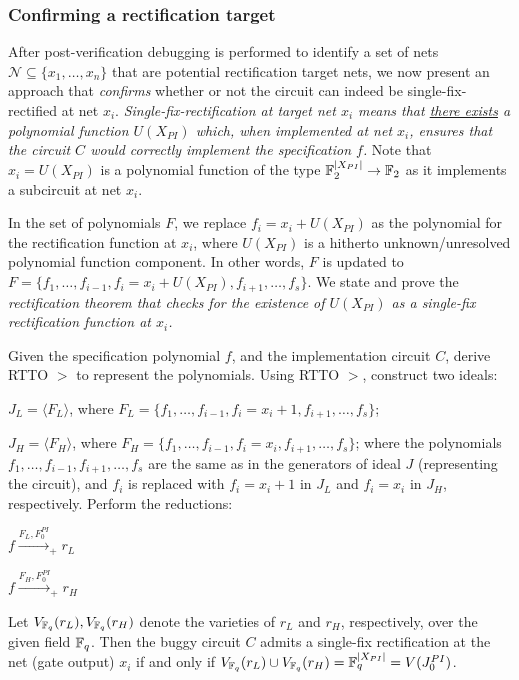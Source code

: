 \subsubsection{Confirming a rectification target} 
After post-verification debugging is performed to identify a set of
nets $\mathcal{N}\subseteq \{x_1,\dots,x_n\}$ that are potential
rectification target nets, we now present an approach that {\it confirms}
whether or not the circuit can indeed be single-fix-rectified at net
$x_i$. {\it Single-fix-rectification at target net $x_i$ means that
  \underline{there exists} a polynomial function $U(X_{PI})$ which,
  when implemented at net $x_i$, ensures that the circuit $C$ would
  correctly implement the specification $f$.} Note that
$x_i=U(X_{PI})$ is a polynomial function of the type
${\mathbb{F}}_2^{|X_{PI}|}\rightarrow{\mathbb{F}}_2$ as it implements a subcircuit at net $x_i$.

In the set of polynomials $F$, we replace $f_i = x_i+U(X_{PI})$ as the
polynomial for the rectification function at $x_i$, where $U(X_{PI})$
is a hitherto unknown/unresolved polynomial function component. In
other words, $F$ is updated to $F = \{f_1,\dots, f_{i-1}, f_i=
x_i+U(X_{PI}),f_{i+1},\dots,f_s\}$.  We state and prove the 
{\it rectification theorem that checks for the existence of
  $U(X_{PI})$ as a single-fix rectification function at $x_i$.}

\begin{Theorem}
Given the specification polynomial $f$, and the implementation circuit
$C$, derive RTTO $>$ to represent the polynomials. Using RTTO $>$,
construct two ideals:  
\bi
\item $J_L = \langle F_L\rangle$, where
  $F_L=\{f_1,\dots,f_{i-1},f_i=x_i+1,f_{i+1},\dots,f_s\}$;
\item $J_H = \langle F_H\rangle$, where
  $F_H=\{f_1,\dots,f_{i-1},f_i=x_i,f_{i+1},\dots,f_s\}$;
\ei
where the polynomials $f_1,\dots,f_{i-1},f_{i+1},\dots,f_s$ are the
same as in the generators of ideal $J$ (representing the circuit), and
$f_i$ is replaced with $f_i = x_i+1$ in $J_L$ and $f_i = x_i$ in $J_H$,
respectively. Perform the reductions: 
\bi
\item $f\xrightarrow{F_L, F_{0}^{PI}}_+r_L $
\item $f\xrightarrow{F_H,F_{0}^{PI}}_+r_H $
\ei

Let $V_{{\mathbb{F}}_{q}}(r_L), V_{{\mathbb{F}}_{q}}(r_H)$ denote the varieties of $r_L$ and
$r_H$, respectively, over the given field ${\mathbb{F}}_{q}$. Then the buggy
circuit $C$ admits a single-fix rectification at the net (gate 
output) $x_i$ if and only if $V_{{\mathbb{F}}_{q}}(r_L) \cup V_{{\mathbb{F}}_{q}}(r_H) =
{\mathbb{F}}_{q}^{|X_{PI}|} = V(J_0^{PI})$.
\end{Theorem}

